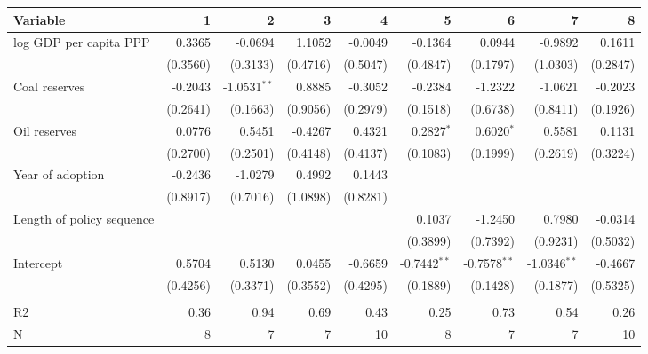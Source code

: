 \begin{tabular}{lrrrrrrrr}
\toprule
                  Variable &         1 &                2 &         3 &         4 &                5 &                6 &                7 &         8 \\
\midrule
    log GDP per capita PPP &    0.3365 &          -0.0694 &    1.1052 &   -0.0049 &          -0.1364 &           0.0944 &          -0.9892 &    0.1611 \\
                           &  (0.3560) &         (0.3133) &  (0.4716) &  (0.5047) &         (0.4847) &         (0.1797) &         (1.0303) &  (0.2847) \\
             Coal reserves &   -0.2043 &  -1.0531$^{* *}$ &    0.8885 &   -0.3052 &          -0.2384 &          -1.2322 &          -1.0621 &   -0.2023 \\
                           &  (0.2641) &         (0.1663) &  (0.9056) &  (0.2979) &         (0.1518) &         (0.6738) &         (0.8411) &  (0.1926) \\
              Oil reserves &    0.0776 &           0.5451 &   -0.4267 &    0.4321 &     0.2827$^{*}$ &     0.6020$^{*}$ &           0.5581 &    0.1131 \\
                           &  (0.2700) &         (0.2501) &  (0.4148) &  (0.4137) &         (0.1083) &         (0.1999) &         (0.2619) &  (0.3224) \\
          Year of adoption &   -0.2436 &          -1.0279 &    0.4992 &    0.1443 &                  &                  &                  &           \\
                           &  (0.8917) &         (0.7016) &  (1.0898) &  (0.8281) &                  &                  &                  &           \\
 Length of policy sequence &           &                  &           &           &           0.1037 &          -1.2450 &           0.7980 &   -0.0314 \\
                           &           &                  &           &           &         (0.3899) &         (0.7392) &         (0.9231) &  (0.5032) \\
                 Intercept &    0.5704 &           0.5130 &    0.0455 &   -0.6659 &  -0.7442$^{* *}$ &  -0.7578$^{* *}$ &  -1.0346$^{* *}$ &   -0.4667 \\
                           &  (0.4256) &         (0.3371) &  (0.3552) &  (0.4295) &         (0.1889) &         (0.1428) &         (0.1877) &  (0.5325) \\
                           &           &                  &           &           &                  &                  &                  &           \\
                        R2 &      0.36 &             0.94 &      0.69 &      0.43 &             0.25 &             0.73 &             0.54 &      0.26 \\
                         N &         8 &                7 &         7 &        10 &                8 &                7 &                7 &        10 \\
\bottomrule
\end{tabular}
